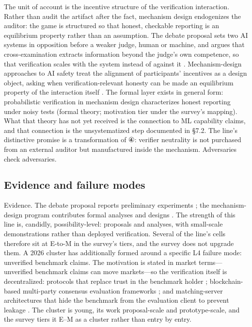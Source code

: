 \documentclass[11pt,a4paper]{article}
\begin{document}
The unit of account is the incentive structure of the verification interaction. Rather than audit the artifact after the fact, mechanism design endogenizes the auditor: the game is structured so that honest, checkable reporting is an equilibrium property rather than an assumption. The debate proposal sets two AI systems in opposition before a weaker judge, human or machine, and argues that cross-examination extracts information beyond the judge's own competence, so that verification scales with the system instead of against it \cite{key09}. Mechanism-design approaches to AI safety treat the alignment of participants' incentives as a design object, asking when verification-relevant honesty can be made an equilibrium property of the interaction itself \cite{key10}. The formal layer exists in general form: probabilistic verification in mechanism design characterizes honest reporting under noisy tests \cite{key43} (formal theory; motivation tier under the survey's mapping). What that theory has not yet received is the connection to ML capability claims, and that connection is the unsystematized step documented in §7.2. The line's distinctive promise is a transformation of ④: verifier neutrality is not purchased from an external auditor but manufactured inside the mechanism. Adversaries check adversaries.

\subsection{Evidence and failure modes}

Evidence. The debate proposal reports preliminary experiments \cite{key09}; the mechanism-design program contributes formal analyses and designs \cite{key10}. The strength of this line is, candidly, possibility-level: proposals and analyses, with small-scale demonstrations rather than deployed verification. Several of the line's cells therefore sit at E-to-M in the survey's tiers, and the survey does not upgrade them. A 2026 cluster has additionally formed around a specific L4 failure mode: unverified benchmark claims. The motivation is stated in market terms—unverified benchmark claims can move markets—so the verification itself is decentralized: protocols that replace trust in the benchmark holder \cite{key44}; blockchain-based multi-party consensus evaluation frameworks \cite{key45}; and matching-server architectures that hide the benchmark from the evaluation client to prevent leakage \cite{key46}. The cluster is young, its work proposal-scale and prototype-scale, and the survey tiers it E–M as a cluster rather than entry by entry.
\end{document}
